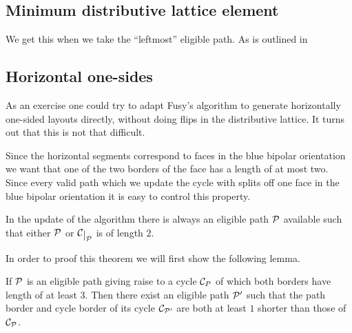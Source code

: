 \subsection{Minimum distributive lattice element}
\label{ss:minimal}
We get this when we take the ``leftmost'' eligible path. As is outlined in \cite{Fusy2006}

\renewcommand{\F}{\scr F}
\subsection{Horizontal one-sides}
\label{ss:blue}

As an exercise one could try to adapt Fusy's algorithm to generate horizontally one-sided layouts directly, without doing flips in the distributive lattice. It turns out that this is not that difficult.

Since the horizontal segments correspond to faces in the blue bipolar orientation we want that one of the two borders of the face has a length of at most two. Since every valid path which we update the cycle with splits off one face in the blue bipolar orientation it is easy to control this property.

\begin{thrm}
\label{th:blueelig}
In the update of the algorithm there is always an eligible path $\P$ available such that either $\P$ or $\restC{\P}$ is of length $2$.
\end{thrm}

In order to proof this theorem we will first show the following lemma.

\begin{lemma}
\label{lem:bluealgo}
If $\P$ is an eligible path giving raise to a cycle $\C_P$ of which both borders have length of at least $3$. Then there exist an eligible path $\P'$ such that the path border and cycle border of its cycle $\C_{\P'}$ are both at least $1$ shorter than those of $\C_\P$.
\end{lemma}

